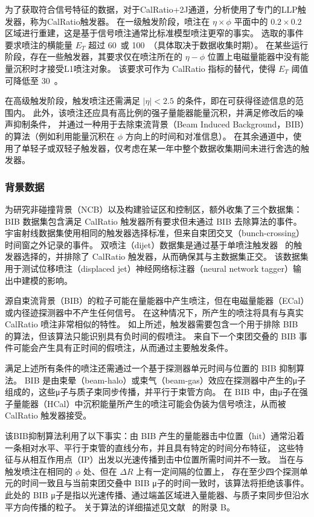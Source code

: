 为了获取符合信号特征的数据，对于CalRatio+2J通道，分析使用了专门的LLP触发器，称为CalRatio触发器。
在一级触发阶段，喷注在 $\eta \times \phi$ 平面中的 $0.2 \times 0.2$ 区域进行重建，这是基于信号喷注通常比标准模型喷注更窄的事实。
选取的事件要求喷注的横能量 $E_T$ 超过 60~\GeV 或 100~\GeV（具体取决于数据收集时期）。
在某些运行阶段，存在一些触发器，其要求仅在喷注所在的 $\eta - \phi$ 位置上电磁量能器中没有能量沉积时才接受L1喷注对象。
该要求可作为 CalRatio 指标的替代，使得 $E_T$ 阈值可降低至 30~\GeV。

在高级触发阶段，触发喷注还需满足 $|\eta| < 2.5$ 的条件，即在可获得径迹信息的范围内。
此外，该喷注还应具有高比例的强子量能器能量沉积，并满足修改后的噪声抑制条件，
并通过一种用于去除束流背景（Beam Induced Background，BIB）的算法（例如利用能量沉积在 $\phi$ 方向上的时间和对准信息）。
在其余通道中，使用了单轻子或双轻子触发器，仅考虑在某一年中整个数据收集期间未进行舍选的触发器。


\subsubsection{背景数据}
为研究非碰撞背景（NCB）以及构建验证区和控制区，额外收集了三个数据集：
BIB 数据集包含满足 CalRatio 触发器所有要求但未通过 BIB 去除算法的事件。
宇宙射线数据集使用相同的触发器选择标准，但来自束团交叉（bunch-crossing）时间窗之外记录的事件。
双喷注（dijet）数据集是通过基于单喷注触发器~\cite{trigger} 的触发器选择的，并排除了 CalRatio 触发器，从而确保其与主数据集正交。
该数据集用于测试位移喷注（displaced jet）神经网络标注器（neural network tagger）输出中建模的影响。

源自束流背景（BIB）的粒子可能在量能器中产生喷注，但在电磁量能器（ECal）或内径迹探测器中不产生任何信号。
在这种情况下，所产生的喷注将具有与真实 CalRatio 喷注非常相似的特性。
如上所述，触发器需要包含一个用于排除 BIB 的算法，但该算法只能识别具有负时间的假喷注。
来自下一个束团交叠的 BIB 事件可能会产生具有正时间的假喷注，从而通过主要触发条件。

满足上述所有条件的喷注还需通过一个基于探测器单元时间与位置的 BIB 抑制算法。
BIB 是由束晕（beam-halo）或束气（beam-gas）效应在探测器中产生的μ子组成的，这些μ子与质子束同步传播，并平行于束管方向。
在 BIB 中，由μ子在强子量能器（HCal）中沉积能量所产生的喷注可能会伪装为信号喷注，从而被 CalRatio 触发器接受。

该BIB抑制算法利用了以下事实：由 BIB 产生的量能器击中位置（hit）通常沿着一条相对水平、平行于束管的直线分布，并且具有特定的时间分布特征，
这些特征与从相互作用点（IP）出发以光速传播到击中位置所需时间并不一致。
当在与触发喷注在相同的 $\phi$ 处、但在 $\Delta R$ 上有一定间隔的位置上，
存在至少四个探测单元的时间一致且与当前束团交叠中 BIB μ子的时间一致时，该算法将拒绝该事件。
此处的 BIB μ子是指以光速传播、通过端盖区域进入量能器、与质子束同步但沿水平方向传播的粒子。
关于算法的详细描述见文献~\cite{ATLAS-CONF-2016-103} 的附录 B。

